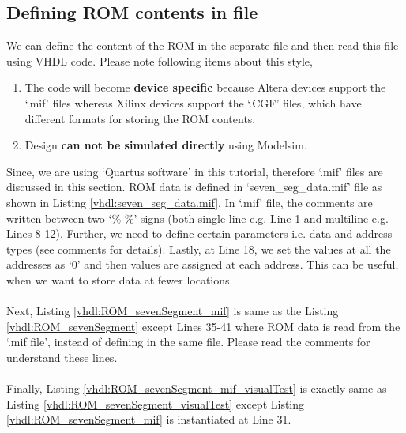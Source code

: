 \subsection{Defining ROM contents in file} 
We can define the content of the ROM in the separate file and then read this file using VHDL code. Please note following items about this style,
\begin{enumerate}
	\item The code will become \textbf{device specific} because Altera devices support the `.mif' files whereas Xilinx devices support the `.CGF' files, which have different formats for storing the ROM contents.
	\item Design \textbf{can not be simulated directly} using Modelsim. 
	\\
\end{enumerate}
Since, we are using `Quartus software' in this tutorial, therefore `.mif' files are discussed in this section. ROM data is defined in `seven\_seg\_data.mif' file as shown in Listing \ref{vhdl:seven_seg_data.mif}. In `.mif' file, the comments are written between two `\%  \%' signs (both single line e.g. Line 1 and multiline e.g. Lines 8-12). Further, we need to define certain parameters i.e. data and address types (see comments for details). Lastly, at Line 18, we set the values at all the addresses as `0' and then values are assigned at each address. This can be useful, when we want to store data at fewer locations. 
\\
\\
Next, Listing \ref{vhdl:ROM_sevenSegment_mif} is same as the Listing \ref{vhdl:ROM_sevenSegment} except Lines 35-41 where ROM data is read from the `.mif file', instead of defining in the same file. Please read the comments for understand these lines. 
\\
\\
Finally, Listing \ref{vhdl:ROM_sevenSegment_mif_visualTest} is exactly same as Listing \ref{vhdl:ROM_sevenSegment_visualTest} except Listing \ref{vhdl:ROM_sevenSegment_mif} is instantiated at Line 31.





